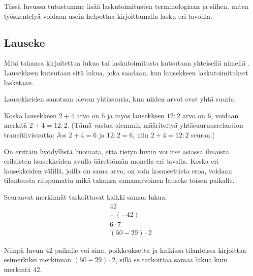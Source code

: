 Tässä luvussa tutustumme lisää laskutoimitusten terminologiaan ja siihen, miten työskentelyä voidaan usein helpottaa kirjoittamalla lasku eri tavoilla.

\subsection{Lauseke}

Mitä tahansa kirjoitettua lukua tai laskutoimitusta kutsutaan yhteisellä nimellä . Lausekkeen  kutsutaan sitä lukua, joka saadaan, kun lausekkeen laskutoimitukset lasketaan.

\begin{esimerkki}
\end{esimerkki}

Lausekkeiden sanotaan olevan yhtäsuuria, kun niiden arvot ovat yhtä suuria.

\begin{esimerkki}
Koska lausekkeen $2+4$ arvo on $6$ ja myös lausekkeen $12:2$ arvo on $6$, voidaan merkitä $2+4=12:2$. (Tämä vastaa aiemmin määriteltyä yhtäsuuruusrelaation transitiivisuutta: Jos $2+4=6$ ja $12:2=6$, niin $2+4=12:2$ seuraa.)
\end{esimerkki}

On erittäin hyödyllistä huomata, että tietyn luvun voi itse asiassa ilmaista erilaisten lausekkeiden avulla äärettömän monella eri tavalla. Koska eri lausekkeiden välillä, joilla on sama arvo, on vain kosmeettista eroa, voidaan tilanteesta riippumatta mikä tahansa samanarvoinen lauseke  toisen paikalle.

\newpage %
\begin{esimerkki}
Seuraavat merkinnät tarkoittavat kaikki samaa lukua:
\begin{align*}
                &42 \\ &-(-42) \\ &6 \cdot 7 \\ &(50-29) \cdot 2
\end{align*}

Niinpä luvun $42$ paikalle voi aina, poikkeuksetta ja kaikissa tilanteissa kirjoittaa esimerkiksi merkinnän $(50-29)\cdot 2$, sillä se tarkoittaa samaa lukua kuin merkintä $42$.
\end{esimerkki}

